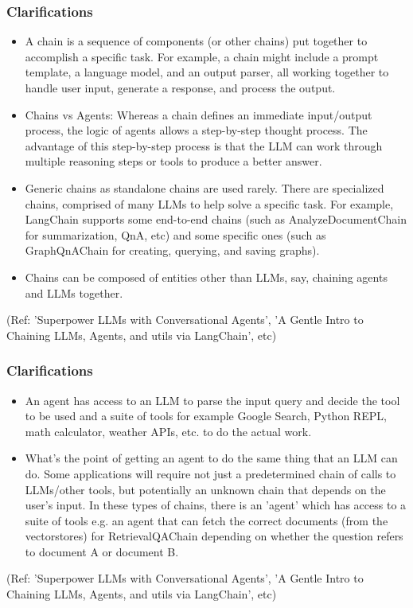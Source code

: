 \begin{frame}[fragile]\frametitle{Clarifications}

\begin{itemize}
\item A chain is a sequence of components (or other chains) put together to accomplish a specific task. For example, a chain might include a prompt template, a language model, and an output parser, all working together to handle user input, generate a response, and process the output.
\item Chains vs Agents: Whereas a chain defines an immediate input/output process, the logic of agents allows a step-by-step thought process. The advantage of this step-by-step process is that the LLM can work through multiple reasoning steps or tools to produce a better answer.
\item Generic chains as standalone chains are used rarely. There are specialized chains, comprised of many LLMs to help solve a specific task. For example, LangChain supports some end-to-end chains (such as AnalyzeDocumentChain for summarization, QnA, etc) and some specific ones (such as GraphQnAChain for creating, querying, and saving graphs). 
\item Chains can be composed of entities other than LLMs, say, chaining agents and LLMs together.
\end{itemize}

{\tiny (Ref: 'Superpower LLMs with Conversational Agents', 'A Gentle Intro to Chaining LLMs, Agents, and utils via LangChain', etc)}
\end{frame}

\begin{frame}[fragile]\frametitle{Clarifications}

\begin{itemize}
\item An agent has access to an LLM to parse the input query and decide the tool to be used and a suite of tools for example Google Search, Python REPL, math calculator, weather APIs, etc. to do the actual work.
\item What’s the point of getting an agent to do the same thing that an LLM can do. Some applications will require not just a predetermined chain of calls to LLMs/other tools, but potentially an unknown chain that depends on the user’s input. In these types of chains, there is an 'agent' which has access to a suite of tools e.g. an agent that can fetch the correct documents (from the vectorstores) for RetrievalQAChain depending on whether the question refers to document A or document B.
\end{itemize}

{\tiny (Ref: 'Superpower LLMs with Conversational Agents', 'A Gentle Intro to Chaining LLMs, Agents, and utils via LangChain', etc)}
\end{frame}

